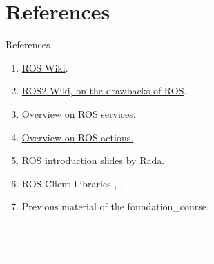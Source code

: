 \documentclass{beamer}
\begin{document}
\section{References}
\begin{frame}{References}

    \begin{enumerate}
        \item \href{http://wiki.ros.org/ROS/Introduction}{ROS Wiki}.
        \item \href{http://design.ros2.org/articles/why_ros2.html}{ROS2 Wiki, on the drawbacks of ROS}.
        \item \href{https://docs.ros.org/en/rolling/Tutorials/Beginner-CLI-Tools/Understanding-ROS2-Services/Understanding-ROS2-Services.html}{Overview on ROS services.}
        
         \item \href{https://docs.ros.org/en/rolling/Tutorials/Beginner-CLI-Tools/Understanding-ROS2-Actions/Understanding-ROS2-Actions.html}{Overview on ROS actions.}   
             
        \item \href{https://wiki.ros.org/Events/CoTeSys-ROS-School?action=AttachFile&do=get&target=ros_tutorial.pdf}{ROS introduction slides by Rada}.
        
        \item ROS Client Libraries     ,
        .
        \color{black}
        \item Previous material of the foundation\_course. 
    \end{enumerate}
\end{frame}



\begin{frame}[plain]{}  
    \centering
    {\huge \textcolor{white}{Thank you}}
    
    \vspace{0.5cm}
    
    {\huge \textcolor{white}{Any questions?}}
\end{frame}
\end{document}
